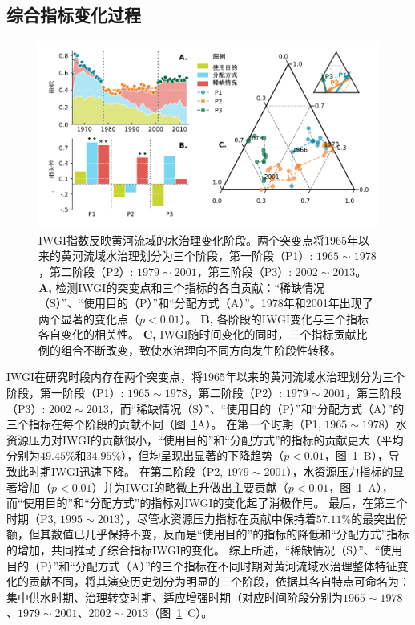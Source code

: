 \subsection{综合指标变化过程}\label{ch4:sec:process}

\begin{figure}[ht!]
	\centering
	\includegraphics[width=\textwidth]{img/ch4/ch4_index.png}
	\caption[IWGI指数反映黄河流域的水治理变化阶段]{IWGI指数反映黄河流域的水治理变化阶段。两个突变点将1965年以来的黄河流域水治理划分为三个阶段，第一阶段（P1）: $1965 \sim 1978$，第二阶段（P2）: $1979 \sim 2001$，第三阶段（P3）: $2002 \sim 2013$。
	\textbf{A,} 检测IWGI的突变点和三个指标的各自贡献：“稀缺情况（S）”、“使用目的（P）”和“分配方式（A）”。1978年和2001年出现了两个显著的变化点（$p<0.01$）。
	\textbf{B,}  各阶段的IWGI变化与三个指标各自变化的相关性。
	\textbf{C,} IWGI随时间变化的同时，三个指标贡献比例的组合不断改变，致使水治理向不同方向发生阶段性转移。
	}\label{ch4:fig:IWGI}
\end{figure}

IWGI在研究时段内存在两个突变点，将1965年以来的黄河流域水治理划分为三个阶段，第一阶段（P1）: $1965 \sim 1978$，第二阶段（P2）: $1979 \sim 2001$，第三阶段（P3）: $2002 \sim 2013$，而“稀缺情况（S）”、“使用目的（P）”和“分配方式（A）”的三个指标在每个阶段的贡献不同（图~\ref{ch4:fig:IWGI}A）。
在第一个时期（P1, $1965 \sim 1978$）水资源压力对IWGI的贡献很小，“使用目的”和“分配方式”的指标的贡献更大（平均分别为$49.45\%$和$34.95\%$），但均呈现出显著的下降趋势（$p<0.01$，图~\ref{ch4:fig:IWGI}~B），导致此时期IWGI迅速下降。
在第二阶段（P2, $1979 \sim 2001$），水资源压力指标的显著增加（$p<0.01$）并为IWGI的略微上升做出主要贡献（$p<0.01$，图~\ref{ch4:fig:IWGI}~A），而“使用目的”和“分配方式”的指标对IWGI的变化起了消极作用。
最后，在第三个时期（P3, $1995 \sim 2013$），尽管水资源压力指标在贡献中保持着$57.11\%$的最突出份额，但其数值已几乎保持不变，反而是“使用目的”的指标的降低和“分配方式”指标的增加，共同推动了综合指标IWGI的变化。
综上所述，“稀缺情况（S）”、“使用目的（P）”和“分配方式（A）”的三个指标在不同时期对黄河流域水治理整体特征变化的贡献不同，将其演变历史划分为明显的三个阶段，依据其各自特点可命名为：集中供水时期、治理转变时期、适应增强时期（对应时间阶段分别为$1965 \sim 1978$、$1979 \sim 2001$、$2002 \sim 2013$（图~\ref{ch4:fig:IWGI}~C）。

